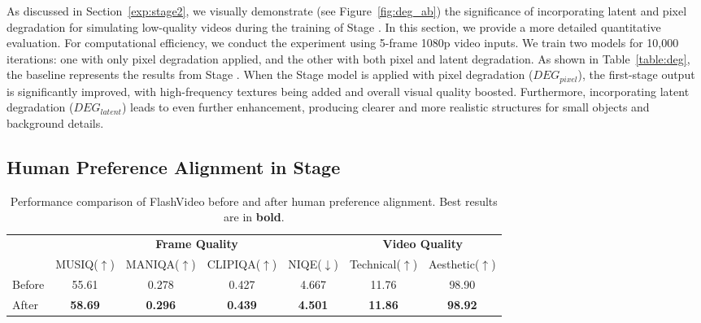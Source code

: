 \label{sec:deg_discuss} As discussed in Section~\ref{exp:stage2}, we visually demonstrate (see Figure~\ref{fig:deg_ab}) the significance of incorporating latent and pixel degradation for simulating low-quality videos during the training of Stage . In this section, we provide a more detailed quantitative evaluation. For computational efficiency, we conduct the experiment using 5-frame 1080p video inputs. We train two models for 10,000 iterations: one with only pixel degradation applied, and the other with both pixel and latent degradation. As shown in Table~\ref{table:deg}, the baseline represents the results from Stage . When the Stage  model is applied with pixel degradation ($DEG_{pixel}$), the first-stage output is significantly improved, with high-frequency textures being added and overall visual quality boosted. Furthermore, incorporating latent degradation ($DEG_{latent}$) leads to even further enhancement, producing clearer and more realistic structures for small objects and background details.

\subsection{Human Preference Alignment in Stage }
\begin{table*}[!t]
\centering
\scriptsize
\setlength{\tabcolsep}{5pt}
\renewcommand{\arraystretch}{1.0}
\begin{tabular}{lcccccc}
\toprule
  & \multicolumn{4}{c}{\textbf{Frame Quality}} & \multicolumn{2}{c}{\textbf{Video  Quality}}  \\
\cmidrule(lr){2-5}
\cmidrule(lr){6-7}
   &  MUSIQ($\uparrow$) & MANIQA($\uparrow$) & CLIPIQA($\uparrow$) & NIQE($\downarrow$)  & Technical($\uparrow$) & Aesthetic($\uparrow$)  \\
\midrule
Before   & 55.61  & 0.278 & 0.427 & 4.667 & 11.76 & 98.90   \\
After   &  \textbf{58.69} & \textbf{0.296} & \textbf{0.439} & \textbf{4.501} & \textbf{11.86} & \textbf{98.92}  \\

\bottomrule
\end{tabular}
\caption{Performance comparison of FlashVideo before and after human preference alignment.  Best results  are in \textbf{bold}.}\label{table:human_stage}
\end{table*}




